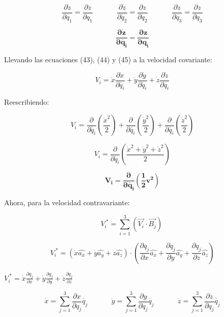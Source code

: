 \documentclass[]{article}
\begin{document}
\[\frac{\partial\dot{z}}{\partial\dot{q_{1}}} = \frac{\partial z}{\partial q_{1}}\ \ \ \ \ \ \ \ \ \ \ \ \ \ \ \frac{\partial\dot{z}}{\partial\dot{q_{2}}} = \frac{\partial z}{\partial q_{2}}\ \ \ \ \ \ \ \ \ \ \ \ \ \ \ \frac{\partial\dot{z}}{\partial\dot{q_{3}}} = \frac{\partial z}{\partial q_{3}}\]

\[\frac{\mathbf{\partial}\dot{\mathbf{z}}}{\mathbf{\partial}\dot{\mathbf{q}_{\mathbf{i}}}}\mathbf{=}\frac{\mathbf{\partial z}}{\mathbf{\partial}\mathbf{q}_{\mathbf{i}}}\]

Llevando las ecuaciones (43), (44) y (45) a la velocidad covariante:

\[V_{i} = \dot{x}\frac{\partial\dot{x}}{\partial\dot{q_{i}}} + \dot{y}\frac{\partial\dot{y}}{\partial\dot{q_{i}}} + \dot{z}\frac{\partial\dot{z}}{\partial\dot{q_{i}}}\]

Reescribiendo:

\[V_{i} = \frac{\partial}{\partial\dot{q_{i}}}\left( \frac{{\dot{x}}^{2}}{2} \right) + \frac{\partial}{\partial\dot{q_{i}}}\left( \frac{{\dot{y}}^{2}}{2} \right) + \frac{\partial}{\partial\dot{q_{i}}}\left( \frac{{\dot{z}}^{2}}{2} \right)\]

\[V_{i} = \frac{\partial}{\partial\dot{q_{i}}}\left( \frac{{\dot{x}}^{2} + {\dot{y}}^{2} + {\dot{z}}^{2}}{2} \right)\]

\[\mathbf{V}_{\mathbf{i}}\mathbf{=}\frac{\mathbf{\partial}}{\mathbf{\partial}\dot{\mathbf{q}_{\mathbf{i}}}}\left( \frac{\mathbf{1}}{\mathbf{2}}\mathbf{v}^{\mathbf{2}} \right)\]

Ahora, para la velocidad contravariante:

\[V_{i}^{\ *} = \sum_{i = 1}^{3}\left( \overrightarrow{V_{i}} \cdot \overrightarrow{B_{j}} \right)\ \]

\[V_{i}^{\ *} = \left( \dot{x}\widehat{a_{x}} + \dot{y}\widehat{a_{y}} + \dot{z}\widehat{a_{z}} \right) \cdot \left( \frac{\partial q_{j}}{\partial x}\widehat{a_{x}} + \frac{\partial q_{j}}{\partial y}\widehat{a_{y}} + \frac{\partial q_{j}}{\partial z}\widehat{a_{z}} \right)\]

\(V_{i}^{\ *} = \dot{x}\frac{\partial q_{j}}{\partial x} + \dot{y}\frac{\partial q_{j}}{\partial y} + \dot{z}\frac{\partial q_{j}}{\partial z}\)

\[\dot{x} = \sum_{j = 1}^{3}\frac{\partial x}{\partial q_{j}}\dot{q_{j}}\ \ \ \ \ \ \ \ \ \ \ \ \ \ \ \dot{y} = \sum_{j = 1}^{3}\frac{\partial y}{\partial q_{j}}\dot{q_{j}}\ \ \ \ \ \ \ \ \ \ \ \ \ \ \ \dot{z} = \sum_{j = 1}^{3}\frac{\partial z}{\partial q_{j}}\dot{q_{j}}\]
\end{document}
